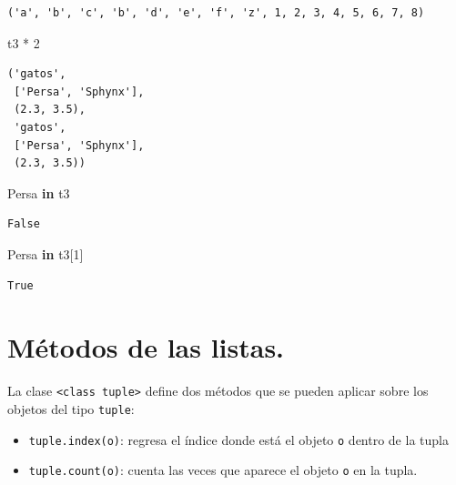 \documentclass[
  spanish,
  letterpaper,
]{scrbook}
\newenvironment{Shaded}{\begin{snugshade}}{\end{snugshade}}
\newcommand{\CommentTok}[1]{\textcolor[rgb]{0.37,0.37,0.37}{#1}}
\newcommand{\DecValTok}[1]{\textcolor[rgb]{0.68,0.00,0.00}{#1}}
\newcommand{\KeywordTok}[1]{\textcolor[rgb]{0.00,0.23,0.31}{\textbf{#1}}}
\newcommand{\NormalTok}[1]{\textcolor[rgb]{0.00,0.23,0.31}{#1}}
\newcommand{\OperatorTok}[1]{\textcolor[rgb]{0.37,0.37,0.37}{#1}}
\providecommand{\tightlist}{%
  \setlength{\itemsep}{0pt}\setlength{\parskip}{0pt}}
\theoremstyle{definition}
\theoremstyle{remark}
\begin{document}
\begin{verbatim}
('a', 'b', 'c', 'b', 'd', 'e', 'f', 'z', 1, 2, 3, 4, 5, 6, 7, 8)
\end{verbatim}

\begin{Shaded}
\begin{Highlighting}[]
\NormalTok{t3 }\OperatorTok{*} \DecValTok{2}
\end{Highlighting}
\end{Shaded}

\begin{verbatim}
('gatos',
 ['Persa', 'Sphynx'],
 (2.3, 3.5),
 'gatos',
 ['Persa', 'Sphynx'],
 (2.3, 3.5))
\end{verbatim}

\begin{Shaded}
\begin{Highlighting}[]
\CommentTok{\textquotesingle{}Persa\textquotesingle{}} \KeywordTok{in}\NormalTok{ t3}
\end{Highlighting}
\end{Shaded}

\begin{verbatim}
False
\end{verbatim}

\begin{Shaded}
\begin{Highlighting}[]
\CommentTok{\textquotesingle{}Persa\textquotesingle{}} \KeywordTok{in}\NormalTok{ t3[}\DecValTok{1}\NormalTok{]}
\end{Highlighting}
\end{Shaded}

\begin{verbatim}
True
\end{verbatim}

\section{Métodos de las listas.}\label{muxe9todos-de-las-listas.-1}

La clase
\texttt{\textless{}class\ \textquotesingle{}tuple\textquotesingle{}\textgreater{}}
define dos métodos que se pueden aplicar sobre los objetos del tipo
\texttt{tuple}:

\begin{itemize}
\tightlist
\item
  \texttt{tuple.index(o)}: regresa el índice donde está el objeto
  \texttt{o} dentro de la tupla
\item
  \texttt{tuple.count(o)}: cuenta las veces que aparece el objeto
  \texttt{o} en la tupla.
\end{itemize}
\end{document}

